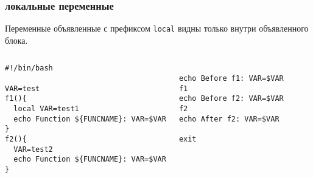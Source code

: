 \begin{frame}[fragile]
	\frametitle{локальные переменные}

	Переменные объявленные с префиксом {\tt local} видны только внутри объявленного блока.

	\small
	\begin{columns}
		\begin{lstlisting}
#!/bin/bash

VAR=test
f1(){
  local VAR=test1
  echo Function ${FUNCNAME}: VAR=$VAR
}
f2(){
  VAR=test2
  echo Function ${FUNCNAME}: VAR=$VAR
}
		\end{lstlisting}
		\begin{lstlisting}

echo Before f1: VAR=$VAR
f1
echo Before f2: VAR=$VAR
f2
echo After f2: VAR=$VAR

exit
\end{lstlisting}
	\end{columns}

\end{frame}
